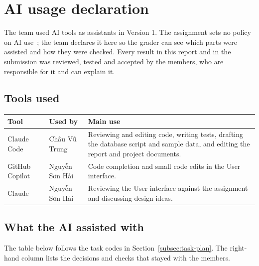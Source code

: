 \section{AI usage declaration}
\label{sec:ai-usage}

The team used AI tools as assistants in Version 1. The assignment sets no policy
on AI use~\cite{ref:assignment}; the team declares it here so the grader can see
which parts were assisted and how they were checked. Every result in this report
and in the submission was reviewed, tested and accepted by the members, who are
responsible for it and can explain it.

\subsection{Tools used}

\begin{center}
\small
\setlength{\tabcolsep}{4pt}
\label{tab:ai-tools}
\begin{tabularx}{\textwidth}{|L{3.4cm}|L{3cm}|Y|}
  \hline
  \textbf{Tool} & \textbf{Used by} & \textbf{Main use}\\
  \hline
  Claude Code~\cite{ref:claude-code} &
  Châu Vũ Trung &
  Reviewing and editing code, writing tests, drafting the database script and
  sample data, and editing the report and project documents.\\
  \hline
  GitHub Copilot~\cite{ref:copilot} &
  Nguyễn Sơn Hải &
  Code completion and small code edits in the User interface.\\
  \hline
  Claude~\cite{ref:claude-code} &
  Nguyễn Sơn Hải &
  Reviewing the User interface against the assignment and discussing design ideas.\\
  \hline
\end{tabularx}
\end{center}

\subsection{What the AI assisted with}

The table below follows the task codes in Section~\ref{subsec:task-plan}.
The right-hand column lists the decisions and checks that stayed with the members.

